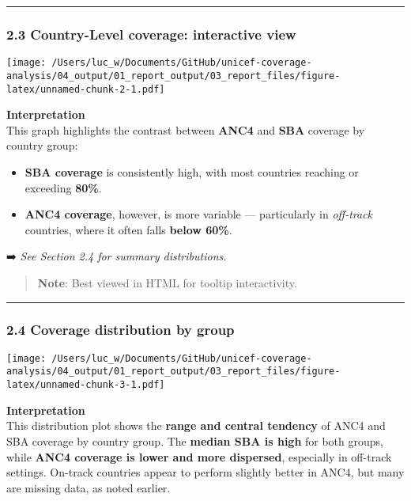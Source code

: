 \documentclass[
]{article}
\providecommand{\tightlist}{%
  \setlength{\itemsep}{0pt}\setlength{\parskip}{0pt}}
\begin{document}
\begin{center}\rule{0.5\linewidth}{0.5pt}\end{center}

\subsubsection{2.3 Country-Level coverage: interactive
view}\label{country-level-coverage-interactive-view}

\texttt{[image: /Users/luc\_w/Documents/GitHub/unicef-coverage-analysis/04\_output/01\_report\_output/03\_report\_files/figure-latex/unnamed-chunk-2-1.pdf]}

\textbf{Interpretation}\\
This graph highlights the contrast between \textbf{ANC4} and
\textbf{SBA} coverage by country group:

\begin{itemize}
\tightlist
\item
  \textbf{SBA coverage} is consistently high, with most countries
  reaching or exceeding \textbf{80\%}.
\item
  \textbf{ANC4 coverage}, however, is more variable --- particularly in
  \emph{off-track} countries, where it often falls \textbf{below 60\%}.
\end{itemize}

➡️ \emph{See Section 2.4 for summary distributions.}

\begin{quote}
\textbf{Note}: Best viewed in HTML for tooltip interactivity.
\end{quote}

\begin{center}\rule{0.5\linewidth}{0.5pt}\end{center}

\subsubsection{2.4 Coverage distribution by
group}\label{coverage-distribution-by-group}

\texttt{[image: /Users/luc\_w/Documents/GitHub/unicef-coverage-analysis/04\_output/01\_report\_output/03\_report\_files/figure-latex/unnamed-chunk-3-1.pdf]}

\textbf{Interpretation}\\
This distribution plot shows the \textbf{range and central tendency} of
ANC4 and SBA coverage by country group. The \textbf{median SBA is high}
for both groups, while \textbf{ANC4 coverage is lower and more
dispersed}, especially in off-track settings. On-track countries appear
to perform slightly better in ANC4, but many are missing data, as noted
earlier.
\end{document}
